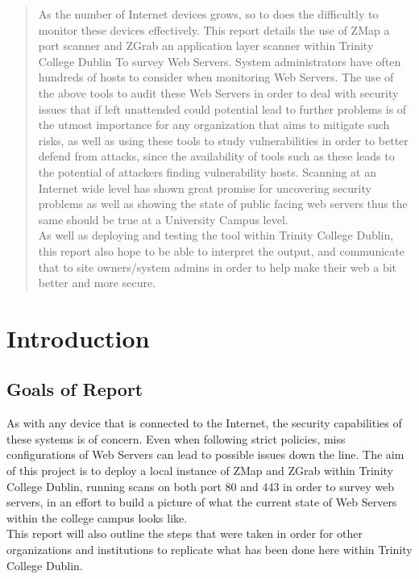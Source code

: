 \documentclass[a4wide,leqno,12pt]{report}
\begin{document}
\begin{abstract}
\noindent
As the number of Internet devices grows, so to does the difficultly to monitor these devices effectively. This report details the use of ZMap a port scanner and ZGrab an application layer scanner within Trinity College Dublin To survey Web Servers. System administrators have often hundreds of hosts to consider when monitoring Web Servers. The use of the above tools to audit these Web Servers in order to deal with security issues that if left unattended could potential lead to further problems is of the utmost importance for any organization that aims to mitigate such risks, as well as using these tools to study vulnerabilities in order to better defend from attacks, since the availability of tools such as these leads to the potential of attackers finding vulnerability hosts. Scanning at an Internet wide level has shown great promise for uncovering security problems as well as showing the state of public facing web servers  \cite{durumeric2015search} thus the same should be true at a University Campus level.\\

As well as deploying and testing the tool within Trinity College Dublin, this report also hope to be able to interpret the output, and communicate that to site owners/system admins in order to help make their web a bit better and more secure.

\end{abstract}


\chapter{Introduction}
\section{Goals of Report}
As with any device that is connected to the Internet, the  security capabilities of these systems is of concern. Even when following strict policies,  miss configurations of Web Servers can lead to possible issues down the line. The aim of this project is to deploy a local instance of ZMap and ZGrab within Trinity College Dublin, running scans on both port 80 and 443 in order to survey web servers, in an effort to build a picture of what the current state of Web Servers within the college campus looks like.\\

This report  will also outline the steps that were taken in order for other organizations and institutions to replicate what has been done here within Trinity College Dublin.\\
\end{document}
